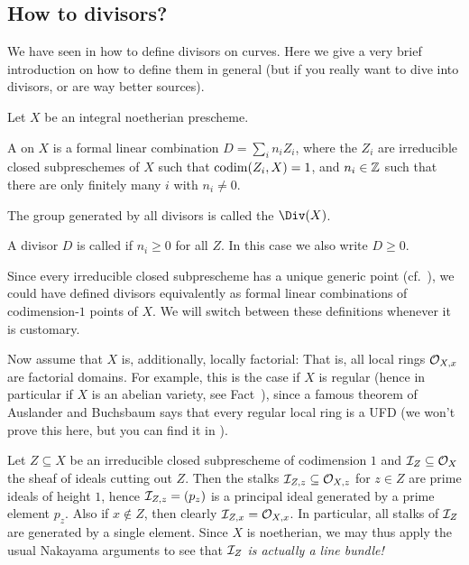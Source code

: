 \documentclass[a4paper,parskip=half,numbers=enddot, DIV=12]{scrreprt}
\renewcommand{\geq}{\geqslant}
\begin{document}
\subsection{How to divisors?}
We have seen in \cite[Ch.~3]{alggeo2} how to define divisors on curves. Here we give a very brief introduction on how to define them in general (but if you really want to dive into divisors, \cite[]{stacks-project} or \cite[Section~II.6]{hartshorne} are way better sources).
\begin{defi}
	Let $X$ be an  integral noetherian prescheme.
	\begin{alphanumerate}
		\item A  on $X$ is a formal linear combination $D=\sum_in_iZ_i$, where the $Z_i$ are irreducible closed subpreschemes of $X$ such that $\operatorname{codim}(Z_i,X)=1$, and $n_i\in\mathbb{Z}$ such that there are only finitely many $i$ with $n_i\neq 0$.
		\item The group generated by all divisors is called the  $\Div(X)$.
		\item A divisor $D$ is called  if $n_i\geq 0$ for all $Z$. In this case we also write $D\geq 0$.
	\end{alphanumerate}
\end{defi}
\begin{rem}
	Since every irreducible closed subprescheme has a unique generic point (cf.\ \cite[Fact~2.1.9]{alggeo1}), we could have defined divisors equivalently as formal linear combinations of codimension-$1$ points of $X$. We will switch between these definitions whenever it is customary.
\end{rem}
Now assume that $X$ is, additionally, locally factorial: That is, all local rings $\mathcal{O}_{X,x}$ are factorial domains. For example, this is the case if $X$ is regular (hence in particular if $X$ is an abelian variety, see Fact~), since a famous theorem of Auslander and Buchsbaum says that every regular local ring is a UFD (we won't prove this here, but you can find it in \cite[Theorem~19.19]{eisenbudCommAlg}).

Let $Z\subseteq X$ be an irreducible closed subprescheme of codimension $1$ and $\mathcal{I}_Z\subseteq \mathcal{O}_X$ the sheaf of ideals cutting out $Z$. Then the stalks $\mathcal{I}_{Z,z}\subseteq \mathcal{O}_{X,z}$ for $z\in Z$ are prime ideals of height $1$, hence
$\mathcal{I}_{Z,z}=(p_z)$ is a principal ideal generated by a prime element $p_z$. Also if $x\notin Z$, then clearly $\mathcal{I}_{Z,x}=\mathcal{O}_{X,x}$. In particular, all stalks of $\mathcal{I}_Z$ are generated by a single element. Since $X$ is noetherian, we may thus apply the usual Nakayama arguments to see that $\mathcal{I}_Z$ \emph{is actually a line bundle!}
\end{document}

